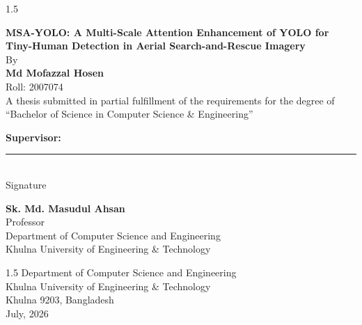 \thispagestyle{plain}
\begin{spacing}{1.5}
\begin{center}
{\sizeTitle\bfseries
MSA-YOLO: A Multi-Scale Attention Enhancement of YOLO for Tiny-Human Detection in Aerial Search-and-Rescue Imagery
}\\[54pt]%

{\normalsize By}\\[36pt]%

{\normalsize\bfseries Md Mofazzal Hosen}\\
{\normalsize Roll: 2007074}\\[24pt]

{\normalsize A thesis submitted in partial fulfillment of the requirements for the degree of}\\
{\normalsize ``Bachelor of Science in Computer Science \& Engineering''}\\[36pt]%
\end{center}

\noindent
\begin{minipage}[t]{0.5\textwidth}{\bfseries Supervisor:}\end{minipage}%
\hfill
\begin{minipage}[t]{0.42\textwidth}\centering
  \vspace{1.5\baselineskip}\rule{4.5cm}{0.4pt}\\ Signature
\end{minipage}

\vspace{0.5\baselineskip}
\hspace*{0.8in}\begin{minipage}[t]{\dimexpr\textwidth-0.8in\relax}
{\bfseries Sk. Md. Masudul Ahsan}\\
Professor\\
Department of Computer Science and Engineering\\
Khulna University of Engineering \& Technology
\end{minipage}

\vfill
\begin{center}
{\sizeFrontHd\bfseries\begin{spacing}{1.5}
Department of Computer Science and Engineering\\
Khulna University of Engineering \& Technology\\
Khulna 9203, Bangladesh\\
July, 2026
\end{spacing}}
\end{center}
\end{spacing}
\clearpage
